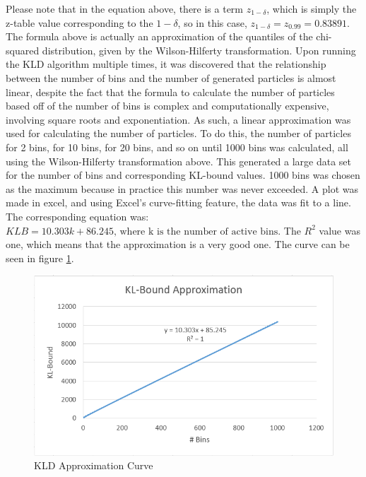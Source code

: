\documentclass{article}
\begin{document}
Please note that in the equation above, there is a term $z_{1-\delta}$, which is simply the z-table value corresponding to the $1-\delta$, so in this case, $z_{1-\delta} = z_{0.99} = 0.83891$. The formula above is actually an approximation of the quantiles of the chi-squared distribution, given by the Wilson-Hilferty transformation\citep{KLD}. Upon running the KLD algorithm multiple times, it was discovered that the relationship between the number of bins and the number of generated particles is almost linear, despite the fact that the formula to calculate the number of particles based off of the number of bins is complex and computationally expensive, involving square roots and exponentiation. As such, a linear approximation was used for calculating the number of particles. To do this, the number of particles for 2 bins, for 10 bins, for 20 bins, and so on until 1000 bins was calculated, all using the Wilson-Hilferty transformation above. This generated a large data set for the number of bins and corresponding KL-bound values. 1000 bins was chosen as the maximum because in practice this number was never exceeded. A plot was made in excel, and using Excel's curve-fitting feature, the data was fit to a line. The corresponding equation was: $KLB = 10.303k + 86.245\textrm{, where k is the number of active bins}$. The $R^2$ value was one, which means that the approximation is a very good one. The curve can be seen in figure \ref{fig:KLD_approximation}.\\

\begin{figure}[h!]
\centering
\includegraphics[scale=0.75]{KLD_Apro.PNG}
\caption{KLD Approximation Curve}
\label{fig:KLD_approximation}
\end{figure}
\end{document}
